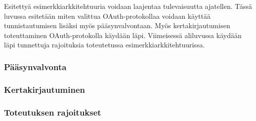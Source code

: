 Esitettyä esimerkkiarkkitehtuuria voidaan laajentaa tulevaisuutta ajatellen. Tässä luvussa esitetään miten valittua OAuth-protokollaa voidaan käyttää tunnistautumisen lisäksi myös pääsynvalvontaan. Myös kertakirjautumisen toteuttaminen OAuth-protokolla käydään läpi. Viimeisessä aliluvussa käydään läpi tunnettuja rajoituksia toteutetussa esimerkkiarkkitehtuurissa.

\subsubsection{Pääsynvalvonta}

\subsubsection{Kertakirjautuminen}

\subsubsection{Toteutuksen rajoitukset}
